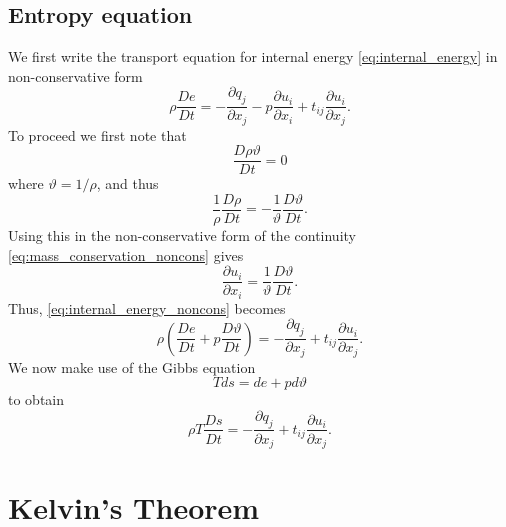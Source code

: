\documentclass[oneside,a4paper,11pt]{report}
\begin{document}
\subsection{Entropy equation} 
We first write the transport equation for internal energy \cref{eq:internal_energy} in non-conservative form
\begin{equation}
\label{eq:internal_energy_noncons}
\rho \frac{ D e}{D t} = -\frac{\partial q_j}{\partial x_j} - p \frac{\partial u_i}{\partial x_i} + t_{ij} \frac{\partial u_i}{\partial x_j}.
\end{equation}
To proceed we first note that
\begin{equation}
    \frac{D \rho \vartheta}{Dt} = 0
\end{equation}
where $\vartheta = 1/\rho$, and thus
\begin{equation}
    \frac{1}{\rho} \frac{D \rho}{Dt} = - \frac{1}{\vartheta} \frac{ D \vartheta}{Dt}.
\end{equation}
Using this in the non-conservative form of the continuity \cref{eq:mass_conservation_noncons} gives
\begin{equation}
    \frac{\partial u_i}{\partial x_i} = \frac{1}{\vartheta} \frac{D \vartheta}{Dt}.
\end{equation}
Thus, \cref{eq:internal_energy_noncons} becomes
\begin{equation}
\rho \left ( \frac{ D e}{D t} + p\frac{D \vartheta}{Dt} \right )= -\frac{\partial q_j}{\partial x_j} + t_{ij} \frac{\partial u_i}{\partial x_j}.
\end{equation}
We now make use of the Gibbs equation
\begin{equation}
    Tds = de + p d\vartheta
\end{equation}
to obtain
\begin{equation}
\label{eq:energy_form_entropy}
\rho T \frac{ D s}{D t} = -\frac{\partial q_j}{\partial x_j} + t_{ij} \frac{\partial u_i}{\partial x_j}.
\end{equation}

\section{Kelvin's Theorem}

\end{document}
